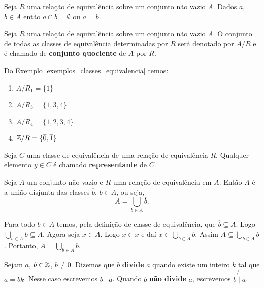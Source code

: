 \begin{corolario}
    Seja $R$ uma relação de equivalência sobre um conjunto não vazio $A$. Dados $a$, $b \in A$ então $\overline{a} \cap \overline{b} = \emptyset$ ou $\overline{a} = \overline{b}$.
\end{corolario}

\begin{definicao}
    Seja $R$ uma relação de equivalência sobre um conjunto não vazio $A$. O conjunto de todas as classes de equivalência determinadas por $R$ ser{á} denotado por $A/R$ e é chamado de \textbf{conjunto quociente} de $A$ por $R$.
\end{definicao}

\begin{exemplos}
    Do Exemplo \ref{exemplos_classes_equivalencia} temos:
    \begin{enumerate}[label={\arabic*})]
        \item $A/R_1 = \{\overline{1}\}$
        \item $A/R_3 = \{\overline{1},\overline{3},\overline{4}\}$
        \item $A/R_4 = \{\overline{1},\overline{2},\overline{3},\overline{4}\}$
        \item $\mathbb{Z}/R = \{\overline{0},\overline{1}\}$
    \end{enumerate}
\end{exemplos}

\begin{definicao}
    Seja $C$ uma classe de equivalência de uma relação de equivalência $R$. Qualquer elemento $y\in C$ é chamado \textbf{representante} de $C$.
\end{definicao}

\begin{proposicao}
    Seja $A$ um conjunto não vazio e $R$ uma relação de equivalência em $A$. Então $A$ é a união disjunta das classes $\overline{b}$, $b \in A$, ou seja,
    \[
        A = \bigcup_{b\in A}\overline{b}.
    \]
\end{proposicao}
\begin{prova}
    Para todo $b\in A$ temos, pela definição de classe de equivalência, que $\overline{b}\subseteq A$. Logo $\bigcup_{b\in A}\overline{b}\subseteq A$. Agora seja $x\in A$. Logo $x \in \overline{x}$ e daí $x\in \bigcup_{b\in A}\overline{b}$. Assim $A\subseteq\bigcup_{b\in A}\overline{b}$. Portanto, $A=\bigcup_{b\in A}\overline{b}$.
\end{prova}

\begin{definicao}
    Sejam $a$, $b \in \mathbb{Z}$, $b \neq 0$. Dizemos que $b$ \textbf{divide} $a$ quando existe um inteiro $k$ tal que $a=bk$.
    Nesse caso escrevemos $b \mid a$. Quando $b$ \textbf{não divide} $a$, escrevemos $b\not{\mid}a$.
\end{definicao}

